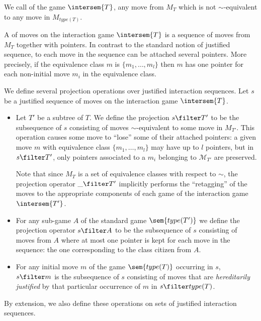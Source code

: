 We call  of the game $\intersem{T}$, any move
from $M_T$ which is not $\sim$-equivalent to any move in
$M_{type(T)}$.


A  of moves on the
interaction game $\intersem{T}$ is a sequence of moves from $M_T$
together with pointers. In contrast to the standard notion of
justified sequence, to each move in the sequence can be attached
several pointers. More precisely, if the equivalence class $m$ is
$\{m_1, \ldots, m_l \}$ then $m$ has one pointer for each
non-initial move $m_i$ in the equivalence class.

\begin{definition}[Projection] We define several projection operations
over justified interaction sequences. Let $s$ be a justified
sequence of moves on the interaction game $\intersem{T}$.
\begin{itemize}
\item  Let $T'$ be a subtree of $T$. We define the
projection $s\filter T'$ to be the subsequence of $s$ consisting
of moves $\sim$-equivalent to some move in $M_{T'}$. This
operation causes some move to ``lose'' some of their attached
pointers: a given move $m$ with equivalence class $\{m_1,
\ldots, m_l \}$ may have up to $l$ pointers, but in $s\filter
T'$, only pointers associated to a $m_i$ belonging to
$\mathcal{M}_{T'}$ are preserved.

Note that since $M_T$ is a set of equivalence classes with
respect to $\sim$, the projection operator $\_ \filter T'$
implicitly performs the ``retagging'' of the moves to the
appropriate components of each game of the interaction game
$\intersem{T'}$.

\item  For any sub-game $A$ of the standard game $\sem{type(T')}$ we
define the projection operator $s\filter A$ to be the
subsequence of $s$ consisting of moves from $A$ where at most
one pointer is kept for each move in the sequence: the one
corresponding to the class citizen from $A$.

\item For any initial move $m$ of the game $\sem{type(T)}$ occurring in $s$, $s
\filter m$ is the subsequence of $s$ consisting of moves
that are \emph{hereditarily justified} by that particular occurrence of $m$ in $s \filter type(T)$.
\end{itemize}
By extension, we also define these operations on sets of justified
interaction sequences.
\end{definition}

